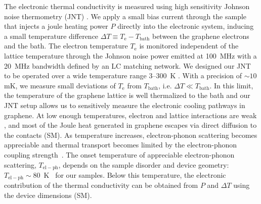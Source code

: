 The electronic thermal conductivity is measured using high sensitivity Johnson noise thermometry (JNT) \cite{fong_ultrasensitive_2012, crossno_development_2015}. We apply a small bias current through the sample that injects a joule heating power $P$ directly into the electronic system, inducing a small temperature difference $\Delta T\equiv T_{\mathrm{e}}-T_{\mathrm{bath}}$ between the graphene electrons and the bath. The electron temperature $T_{\mathrm{e}}$ is monitored independent of the lattice temperature through the Johnson noise power emitted at 100~MHz with a 20~MHz bandwidth defined by an LC matching network. We designed our JNT to be operated over a wide temperature range 3--300~K \cite{crossno_development_2015}. With a precision of $\sim 10$ mK, we measure small deviations of $T_{\mathrm{e}}$ from $T_{\mathrm{bath}}$, i.e. $\Delta T\ll T_{\mathrm{bath}}$. In this limit, the temperature of the graphene lattice is well thermalized to the bath \cite{fong_ultrasensitive_2012} and our JNT setup allows us to sensitively measure the electronic cooling pathways in graphene. At low enough temperatures, electron and lattice interactions are weak \cite{crossno_development_2015, fong_measurement_2013}, and most of the Joule heat generated in graphene escapes via direct diffusion to the contacts (SM). As temperature increases, electron-phonon scattering becomes appreciable and thermal transport becomes limited by the electron-phonon coupling strength~\cite{fong_measurement_2013, betz_hot_2012, mckitterick_electron-phonon_2016}. The onset temperature of appreciable electron-phonon scattering, $T_{\mathrm{el-ph}}$, depends on the sample disorder and device geometry: $T_{\mathrm{el-ph}}\sim$80~K~\cite{fong_measurement_2013, crossno_development_2015, yigen_wiedemannfranz_2014, laitinen_electron-phonon_2014} for our samples. Below this temperature, the electronic contribution of the thermal conductivity can be obtained from $P$ and $\Delta T$ using the device dimensions (SM).

